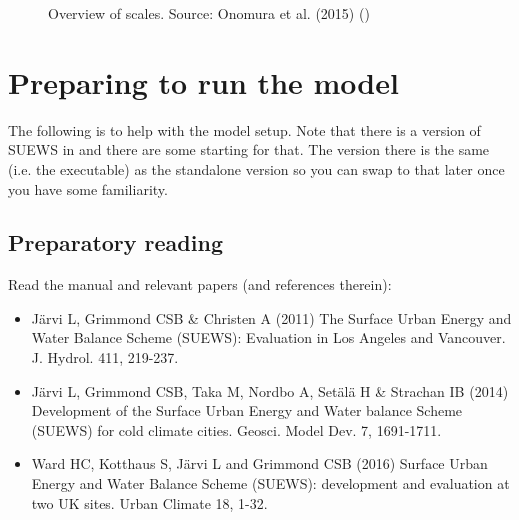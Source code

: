 \documentclass[letterpaper,10pt,english]{sphinxmanual}
\begin{document}
\begin{figure}[htbp]
\centering
\capstart

\noindent{}
\caption{Overview of scales. Source: Onomura et al. (2015) \label{\detokenize{parameterisations-and-sub-models:id24}}{\hyperref[\detokenize{references:shiho2015}]{\sphinxcrossref{{[}Shiho2015{]}}}} ()}\label{\detokenize{parameterisations-and-sub-models:id25}}\end{figure}


\chapter{Preparing to run the model}
\label{\detokenize{prepare-to-run-the-model::doc}}\label{\detokenize{prepare-to-run-the-model:preparing-to-run-the-model}}
The following is to help with the model setup. Note that there is a
version of SUEWS in 
and there are some starting
 for
that. The version there is the same (i.e. the executable) as the
standalone version so you can swap to that later once you have some
familiarity.


\section{Preparatory reading}
\label{\detokenize{prepare-to-run-the-model:preparatory-reading}}
Read the manual and relevant papers (and references therein):
\begin{itemize}
\item {} 
Järvi L, Grimmond CSB \& Christen A (2011) The Surface Urban Energy
and Water Balance Scheme (SUEWS): Evaluation in Los Angeles and
Vancouver. J. Hydrol. 411, 219-237.

\item {} 
Järvi L, Grimmond CSB, Taka M, Nordbo A, Setälä H \& Strachan IB
(2014) Development of the Surface Urban Energy and Water balance
Scheme (SUEWS) for cold climate cities. Geosci. Model Dev. 7,
1691-1711.

\item {} 
Ward HC, Kotthaus S, Järvi L and Grimmond CSB (2016) Surface Urban
Energy and Water Balance Scheme (SUEWS): development and evaluation
at two UK sites. Urban Climate 18, 1-32.

\end{itemize}
\end{document}
